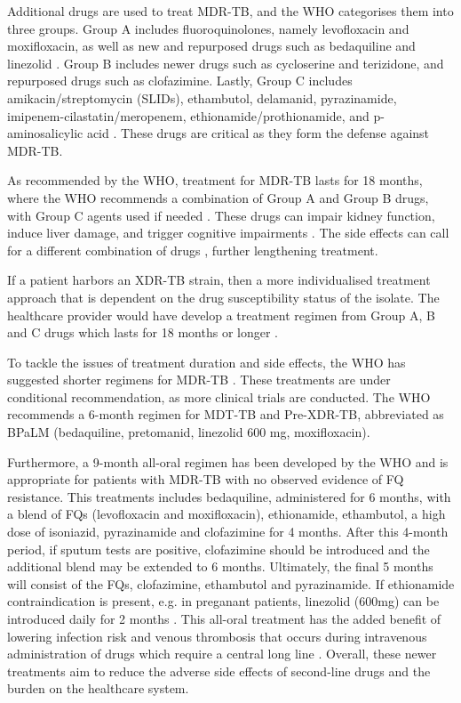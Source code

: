 Additional drugs are used to treat MDR-TB, and the WHO categorises them into three groups. Group A includes fluoroquinolones, namely levofloxacin and moxifloxacin, as well as new and repurposed drugs such as bedaquiline and linezolid \cite{Aguilar2023, whoguide2022}. Group B includes newer drugs such as cycloserine and terizidone, and repurposed drugs such as clofazimine. Lastly, Group C includes amikacin/streptomycin (SLIDs), ethambutol, delamanid, pyrazinamide, imipenem-cilastatin/meropenem, ethionamide/prothionamide, and p-aminosalicylic acid \cite{whoguide2022}. These drugs are critical as they form the defense against MDR-TB. 

As recommended by the WHO, treatment for MDR-TB lasts for 18 months, where the WHO recommends a combination of Group A and Group B drugs, with Group C agents used if needed \cite{whoguide2022}. These drugs can impair kidney function, induce liver damage, and trigger cognitive impairments \cite{sturdy2011mdr}. The side effects can call for a different combination of drugs \cite{whitney2016}, further lengthening treatment. 

If a patient harbors an XDR-TB strain, then a more individualised treatment approach that is dependent on the drug susceptibility status of the isolate. The healthcare provider would have develop a treatment regimen from Group A, B and C drugs which lasts for 18 months or longer \cite{who2022,whoguide2022}. 

To tackle the issues of treatment duration and side effects, the WHO has suggested shorter regimens for MDR-TB \cite{whoguide2022}. These treatments are under conditional recommendation, as more clinical trials are conducted\cite{whoguide2022}. The WHO recommends a 6-month regimen for MDT-TB and Pre-XDR-TB, abbreviated as BPaLM (bedaquiline, pretomanid, linezolid 600 mg, moxifloxacin).

Furthermore, a 9-month all-oral regimen has been developed by the WHO and is appropriate for patients with MDR-TB with no observed evidence of FQ resistance. This treatments includes bedaquiline, administered for 6 months, with a blend of FQs (levofloxacin and moxifloxacin), ethionamide, ethambutol, a high dose of isoniazid, pyrazinamide and clofazimine for 4 months. After this 4-month period, if sputum tests are positive, clofazimine should be introduced and the additional blend may be extended to 6 months. Ultimately, the final 5 months will consist of the FQs, clofazimine, ethambutol and pyrazinamide. If ethionamide contraindication is present, e.g. in preganant patients, linezolid (600mg) can be introduced daily for 2 months \cite{whoguide2022}. This all-oral treatment has the added benefit of lowering infection risk and venous thrombosis that occurs during intravenous administration of drugs which require a central long line \cite{whitney2016}. Overall, these newer treatments aim to reduce the adverse side effects of second-line drugs and the burden on the healthcare system.

